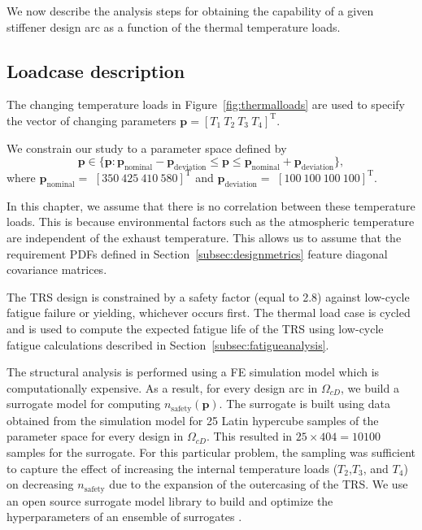 We now describe the analysis steps for obtaining the capability of a given stiffener design arc as a function of the thermal temperature loads.

\subsection{Loadcase description} \label{subsec:loadcase}

The changing temperature loads in Figure~\ref{fig:thermalloads} are used to specify the vector of changing parameters $\mathbf{p} = \left[ T_1 ~ T_2 ~ T_3 ~ T_4 \right]^{\mathrm{T}}$.

We constrain our study to a parameter space defined by 
%
\begin{equation*}
	\mathbf{p} \in \{ \mathbf{p}: \mathbf{p}_{\textrm{nominal}} -\mathbf{p}_{\textrm{deviation}} \leq \mathbf{p} \leq \mathbf{p}_{\textrm{nominal}} + \mathbf{p}_{\textrm{deviation}} \},
\end{equation*}
%
where $\mathbf{p}_{\textrm{nominal}} =$ $[ 350 ~ 425 ~ 410 ~ 580]^{\mathrm{T}}$ and $\mathbf{p}_{\textrm{deviation}} =$ $[100 ~ 100 ~ 100 ~ 100]^{\mathrm{T}}$. 

In this chapter, we assume that there is no correlation between these temperature loads. This is because environmental factors such as the atmospheric temperature are independent of the exhaust temperature. This allows us to assume that the requirement \acp{PDF} defined in Section~\ref{subsec:designmetrics} feature diagonal covariance matrices.

The \ac{TRS} design is constrained by a safety factor (equal to 2.8) against low-cycle fatigue failure or yielding, whichever occurs first. The thermal load case is cycled and is used to compute the expected fatigue life of the \ac{TRS} using low-cycle fatigue calculations described in Section~\ref{subsec:fatigueanalysis}. 

The structural analysis is performed using a \ac{FE} simulation model which is computationally expensive. As a result, for every design arc in $\Omega_{cD}$, we build a surrogate model for computing $n_{\textrm{safety}}(\mathbf{p})$. The surrogate is built using data obtained from the simulation model for 25 Latin hypercube samples of the parameter space for every design in $\Omega_{cD}$. This resulted in $25\times404=10100$ samples for the surrogate. For this particular problem, the sampling was sufficient to capture the effect of increasing the internal temperature loads ($T_2$,$T_3$, and $T_4$) on decreasing $n_{\textrm{safety}}$ due to the expansion of the outercasing of the \ac{TRS}. We use an open source surrogate model library to build and optimize the hyperparameters of an ensemble of surrogates \cite{Talgorn2018}. 

